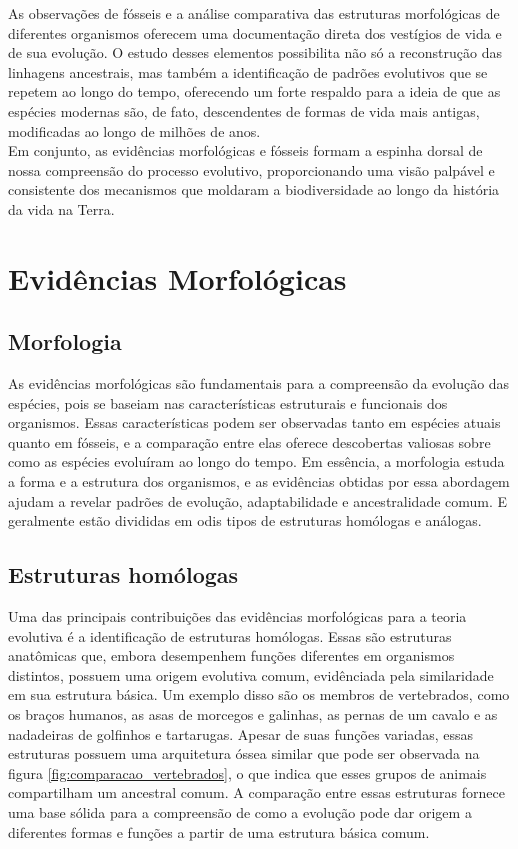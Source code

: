 \documentclass{report}
\begin{document}
As observações de fósseis e a análise comparativa das estruturas morfológicas de diferentes organismos oferecem uma documentação direta dos vestígios de vida e de sua evolução. O estudo desses elementos possibilita não só a reconstrução das linhagens ancestrais, mas também a identificação de padrões evolutivos que se repetem ao longo do tempo, oferecendo um forte respaldo para a ideia de que as espécies modernas são, de fato, descendentes de formas de vida mais antigas, modificadas ao longo de milhões de anos.\\

Em conjunto, as evidências morfológicas e fósseis formam a espinha dorsal de nossa compreensão do processo evolutivo, proporcionando uma visão palpável e consistente dos mecanismos que moldaram a biodiversidade ao longo da história da vida na Terra.

\section{Evidências Morfológicas}\label{sec.fosseis2}

\subsection{Morfologia}\label{subsec.fosseis2.1}

As evidências morfológicas são fundamentais para a compreensão da evolução das espécies, pois se baseiam nas características estruturais e funcionais dos organismos. Essas características podem ser observadas tanto em espécies atuais quanto em fósseis, e a comparação entre elas oferece descobertas valiosas sobre como as espécies evoluíram ao longo do tempo. Em essência, a morfologia estuda a forma e a estrutura dos organismos, e as evidências obtidas por essa abordagem ajudam a revelar padrões de evolução, adaptabilidade e ancestralidade comum. E geralmente estão divididas em odis tipos de estruturas homólogas e análogas.\\

\subsection{Estruturas homólogas}\label{subsec.fosseis2.2}

Uma das principais contribuições das evidências morfológicas para a teoria evolutiva é a identificação de estruturas homólogas. Essas são estruturas anatômicas que, embora desempenhem funções diferentes em organismos distintos, possuem uma origem evolutiva comum, evidênciada pela similaridade em sua estrutura básica. Um exemplo disso são os membros de vertebrados, como os braços humanos, as asas de morcegos e galinhas, as pernas de um cavalo e as nadadeiras de golfinhos e tartarugas. Apesar de suas funções variadas, essas estruturas possuem uma arquitetura óssea similar que pode ser observada na figura \ref{fig:comparacao_vertebrados}, o que indica que esses grupos de animais compartilham um ancestral comum. A comparação entre essas estruturas fornece uma base sólida para a compreensão de como a evolução pode dar origem a diferentes formas e funções a partir de uma estrutura básica comum.\\
\end{document}

